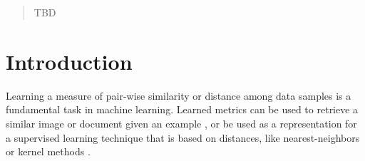 \documentclass{article}
\begin{document}
 


\newcommand\todo[1]{\textbf{<ToDo:#1}!}
\newcommand\mat[1]{{#1}}
\renewcommand\vec[1]{\mathbf{#1}}
\newcommand{\T}{{}^\mathsf{T}}
\newcommand{\W}{\mat{W}}
\newcommand{\E}{\mat{E}}
\newcommand{\newW}{{\mat{W^*}}}
\newcommand{\eqdef}{\doteq}
\newcommand{\Rd}{\mathbb{R}^d}
\newcommand{\tL}{\tilde{L}(\W)}

\newcommand{\frob}[1]{{\cdot \|#1\|_F^2}} 

\newcommand{\ignore}[1]{}

\newcommand{\q}{{\vec{q}}}
\newcommand{\p}{{\vec{p}}}

\newtheorem{theorem}{Theorem}
\newtheorem{lemma}{Lemma}
\newtheorem{corollary}{Corollary}
\newtheorem{definition}{Definition}



\begin{abstract} 
TBD
\end{abstract} 

\section{Introduction}
Learning a measure of pair-wise similarity or distance among data samples is a fundamental task in machine learning. Learned metrics can be used to retrieve a similar image or document given an example \cite{}, or be used as a representation for a supervised learning technique that is based on distances, like nearest-neighbors or kernel methods \cite{}.
\end{document}
